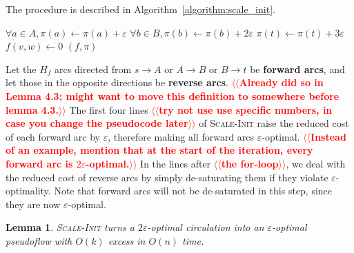 \documentclass[11pt]{article}
\makeatletter
\def\eps{\varepsilon}
\def\supp{\operatorname{supp}}
\theoremstyle{plain}
\newtheorem{lemma}{Lemma}[section]
\numberwithin{figure}{section}
\def\EMPH#1{\textbf{\boldmath #1}}
\def\n@te#1{\textsf{\boldmath \textbf{$\langle\!\langle$#1$\rangle\!\rangle$}}\leavevmode}
\def\note#1{\textcolor{red}{\n@te{#1}}}
\makeatother
\begin{document}
The procedure is described in Algorithm~\ref{algorithm:scale_init}.

\begin{figure*}[h]
\centering
\begin{minipage}{.5\linewidth}
\begin{algorithm}[H]
\caption{Scale Initialization}
\label{algorithm:scale_init}
\begin{algorithmic}[1]
	\State $\forall a \in A, \pi(a) \gets \pi(a) + \eps$
	\State $\forall b \in B, \pi(b) \gets \pi(b) + 2\eps$
	\State $\pi(t) \gets \pi(t) + 3\eps$
	\ForAll{$(v, w) \in \supp(f)$}
		\If{$c_\pi(w, v) < -\eps$}
			\State $f(v, w) \gets 0$
		\EndIf
	\EndFor
	\State\Return $(f, \pi)$
\EndFunction
\end{algorithmic}
\end{algorithm}
\end{minipage}
\end{figure*}

Let the $H_f$ arcs directed from $s \to A$ or $A \to B$ or $B \to t$ be
\EMPH{forward arcs}, and let those in the opposite directions be
\EMPH{reverse arcs}.
\note{Already did so in Lemma 4.3; might want to move this definition to somewhere before lemma 4.3.}
The first four lines \note{try not use use specific numbers, in case you change the pseudocode later} of \textsc{Scale-Init} raise the reduced cost of each
forward arc by $\eps$, therefore making all forward arcs $\eps$-optimal.
\note{Instead of an example, mention that at the start of the iteration, every forward arc is $2\eps$-optimal.}
In the lines after \note{the for-loop}, we deal with the reduced cost of reverse arcs by simply
de-saturating them if they violate $\eps$-optimality.
Note that forward arcs will not be de-saturated in this step, since they are
now $\eps$-optimal.

\begin{lemma}
\label{lemma:scale_init}
\textsc{Scale-Init} turns a $2\eps$-optimal circulation into an
$\eps$-optimal pseudoflow with $O(k)$ excess in $O(n)$ time.
\end{lemma}
\end{document}
